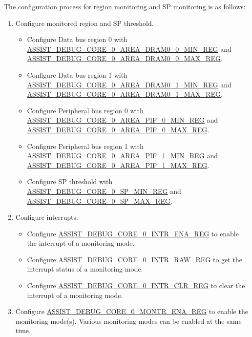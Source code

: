 \documentclass[main\_\_EN.tex]{subfiles}
\begin{document}
The configuration process for region monitoring and SP monitoring is as follows:

\begin{enumerate}
    \item Configure monitored region and SP threshold.
        \begin{itemize}
            \item Configure Data bus region 0 with \hyperref[regdesc:ASSISTDEBUGCORE0AREADRAM00MINREG]{ASSIST\_DEBUG\_CORE\_0\_AREA\_DRAM0\_0\_MIN\_REG} and\\ \hyperref[regdesc:ASSISTDEBUGCORE0AREADRAM00MAXREG]{ASSIST\_DEBUG\_CORE\_0\_AREA\_DRAM0\_0\_MAX\_REG}. 
            \item Configure Data bus region 1 with \hyperref[regdesc:ASSISTDEBUGCORE0AREADRAM01MINREG]{ASSIST\_DEBUG\_CORE\_0\_AREA\_DRAM0\_1\_MIN\_REG} and\\ \hyperref[regdesc:ASSISTDEBUGCORE0AREADRAM01MAXREG]{ASSIST\_DEBUG\_CORE\_0\_AREA\_DRAM0\_1\_MAX\_REG}.
            \item Configure Peripheral bus region 0 with \hyperref[regdesc:ASSISTDEBUGCORE0AREAPIF0MINREG]{ASSIST\_DEBUG\_CORE\_0\_AREA\_PIF\_0\_MIN\_REG} and\\ \hyperref[regdesc:ASSISTDEBUGCORE0AREAPIF0MAXREG]{ASSIST\_DEBUG\_CORE\_0\_AREA\_PIF\_0\_MAX\_REG}.
            \item Configure Peripheral bus region 1 with \hyperref[regdesc:ASSISTDEBUGCORE0AREAPIF1MINREG]{ASSIST\_DEBUG\_CORE\_0\_AREA\_PIF\_1\_MIN\_REG} and\\ \hyperref[regdesc:ASSISTDEBUGCORE0AREAPIF1MAXREG]{ASSIST\_DEBUG\_CORE\_0\_AREA\_PIF\_1\_MAX\_REG}.
            \item Configure SP threshold with \hyperref[regdesc:ASSISTDEBUGCORE0SPMINREG]{ASSIST\_DEBUG\_CORE\_0\_SP\_MIN\_REG} and\\ \hyperref[regdesc:ASSISTDEBUGCORE0SPMAXREG]{ASSIST\_DEBUG\_CORE\_0\_SP\_MAX\_REG}.
        \end{itemize}
    
    \item Configure interrupts.
    \begin{itemize}
        \item Configure \hyperref[regdesc:ASSISTDEBUGCORE0INTRENAREG]{ASSIST\_DEBUG\_CORE\_0\_INTR\_ENA\_REG} to enable the interrupt of a monitoring mode. 
        \item Configure \hyperref[regdesc:ASSISTDEBUGCORE0INTRRAWREG]{ASSIST\_DEBUG\_CORE\_0\_INTR\_RAW\_REG} to get the interrupt status of a monitoring mode. 
        \item Configure \hyperref[regdesc:ASSISTDEBUGCORE0INTRCLRREG]{ASSIST\_DEBUG\_CORE\_0\_INTR\_CLR\_REG} to clear the interrupt of a monitoring mode.
    \end{itemize}
    \item Configure \hyperref[regdesc:ASSISTDEBUGCORE0MONTRENAREG]{ASSIST\_DEBUG\_CORE\_0\_MONTR\_ENA\_REG} to enable the monitoring mode(s). Various monitoring modes can be enabled at the same time.
\end{enumerate}
\end{document}
